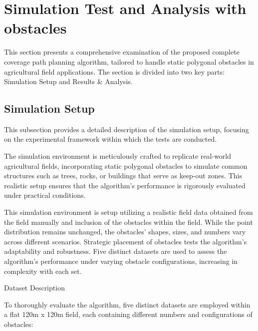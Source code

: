 
\section{Simulation Test and Analysis with obstacles} 


This section presents a comprehensive examination of the proposed complete coverage path planning algorithm, tailored to handle static polygonal obstacles in agricultural field applications. The section is divided into two key parts: Simulation Setup and Results \& Analysis.

\subsection{Simulation Setup}

This subsection provides a detailed description of the simulation setup, focusing on the experimental framework within which the tests are conducted.

\vspace*{6mm}  


The simulation environment is meticulously crafted to replicate real-world agricultural fields, incorporating static polygonal obstacles to simulate common structures such as trees, rocks, or buildings that serve as keep-out zones. This realistic setup ensures that the algorithm's performance is rigorously evaluated under practical conditions.

\vspace*{6mm}  

This simulation environment is setup utilizing a realistic field data obtained from the field manually and inclusion of the obstacles within the field. While the point distribution remains unchanged, the obstacles' shapes, sizes, and numbers vary across different scenarios. Strategic placement of obstacles tests the algorithm's adaptability and robustness. Five distinct datasets are used to assess the algorithm's performance under varying obstacle configurations, increasing in complexity with each set.



\vspace*{6mm}  

Dataset Description

To thoroughly evaluate the algorithm, five distinct datasets are employed within a flat 120m x 120m field, each containing different numbers and configurations of obstacles:


